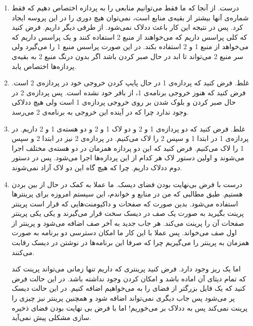 \begin{enumerate}
    \item درست. از آنجا که ما فقط می‌توانیم منابعی را به پردازه اختصاص دهیم که فقط شماره‌ی آنها بیشتر از
    بقیه‌ی منابع است، نمی‌توان هیچ دوری را در این پروسه ایجاد کرد. پس در نتیجه این کار باعث
    ددلاک نمی‌شود. از طرفی دیگر
    داریم. فرض کنید که کلی پراسس داریم که می‌خواهند از منبع 2 استفاده کنند و یک پراسس داریم که می‌خواهد
    از منبع 1 و 2 استفاده بکند. در این صورت پراسس منبع 1 را می‌گیرد ولی سر منبع 2 می‌تواند تا ابد در حال
    صبر کردن باشد اگر بدون درنگ منبع 2 به بقیه‌ی پردازه‌ها اختصاص یابد.
    \item غلط. فرض کنید که پردازه‌ی 1 در حال پایپ کردن خروجی خود در پردازه‌ی 2 است. فرض کنید که هنوز
    خروجی برنامه‌ی 1، از بافر خود
    نشده است. پس پردازه‌ی 2 در حال صبر کردن و بلوک شدن بر روی خروجی پردازه‌ی 1 است ولی هیچ ددلاکی وجود ندارد
    چرا که در آینده این خروجی به برنامه‌ی 2 می‌رسد.
    \item غلط. فرض کنید که دو پردازه‌ی 1 و 2 و دو لاک 1 و 2 و دو هسته‌ی 1 و 2 داریم.
    در پردازه‌ی 1 در ابتدا 1 و سپس 2 را لاک می‌کنیم.
    در پردازه‌ی 2 نیز در ابتدا 2 و سپس 1 را لاک می‌کنیم.
    فرض کنید که این دو پردازه همزمان در دو هسته‌ی مختلف اجرا می‌شوند و اولین دستور لاک هر کدام از این پردازه‌ها
    اجرا می‌شود. پس در دستور دوم ددلاک داریم. چرا که هیچ گاه این دو لاک آزاد نمی‌شوند.
    \item درست با فرض بی‌نهایت بودن فضای دیسک. ما عملا به کمک
    در حال از بین بردن
    هستیم. طبق مطالبی که من در منابع و
    خواندم، این سیستم امروزه برای پرینتر‌ها استفاده می‌شود. بدین صورت که صفحات و داکیومنت‌هایی که قرار است
    پرینتر پرینت بگیرید به صورت یک صف در دیسک سخت قرار می‌گیرند و یکی یکی پرینتر صفحات آن را پرینت می‌کند.
    هر جاب جدید به آخر صف اضافه می‌شود و پرینتر از اول صف می‌خواند. پس عملا با این کار ما امکان دسترسی دو
    برنامه به صورت همزمان به پرینتر را می‌گیریم چرا که صرفا این برنامه‌ها در
    نوشتن در دیسک رقابت می‌کنند.

    اما یک
    ریز وجود دارد. فرض کنید پرینتری که داریم تنها زمانی می‌تواند پرینت کند که تمام دیتای آن اماده باشد
    و امکان
    کردن وجود نداشته باشد. در این حالت فرض کنید که یک فایل بزرگتر از فضای
    را به
    می‌خواهیم اضافه کنیم. در این حالت دیسک پر می‌شود پس جاب دیگری نمی‌تواند اضافه شود و همچنین پرینتر
    نیز چیزی را پرینت نمی‌کند پس به ددلاک بر می‌خوریم! اما با فرض بی نهایت بودن فضای ذخیره سازی مشکلی
    پیش نمی‌آید.
    
\end{enumerate}